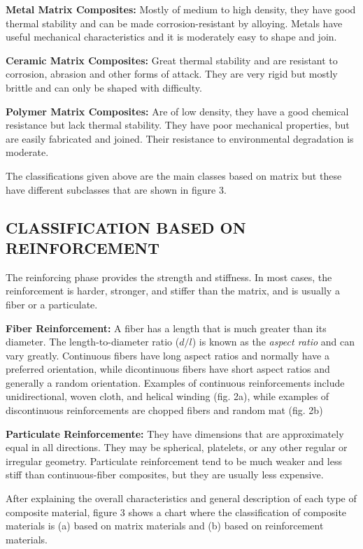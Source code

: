\documentclass[letterpaper]{article}
\begin{document}
\begin{multicols}{2}
	\textbf{Metal Matrix Composites:} Mostly of medium to high density, they have good thermal stability and can be made corrosion-resistant by alloying. Metals have useful mechanical characteristics and it is moderately easy to shape and join.

	\textbf{Ceramic Matrix Composites:} Great thermal stability and are resistant to corrosion, abrasion and other forms of attack. They are very rigid but mostly brittle and can only be shaped with difficulty.
	
	\textbf{Polymer Matrix Composites:} Are of low density, they have a good chemical resistance but lack thermal stability. They have poor mechanical properties, but are easily fabricated and joined. Their resistance to environmental degradation is moderate. \supercite{altenbach04}

	The classifications given above are the main classes based on matrix but these have different subclasses that are shown in figure 3.

	\subsection*{CLASSIFICATION BASED ON REINFORCEMENT}
	The reinforcing phase provides the strength and stiffness. In most cases, the reinforcement is harder, stronger, and stiffer than the matrix, and is usually a fiber or a particulate.

	\textbf{Fiber Reinforcement:} A fiber has a length that is much greater than its diameter. The length-to-diameter ratio ($d/l$) is known as the \textit{aspect ratio} and can vary greatly. Continuous fibers have long aspect ratios and normally have a preferred orientation, while dicontinuous fibers have short aspect ratios and generally a random orientation.
	Examples of continuous reinforcements include unidirectional, woven cloth, and helical winding (fig. 2a), while examples of discontinuous reinforcements are chopped fibers and random mat (fig. 2b)
	
	\textbf{Particulate Reinforcemente:} They have dimensions that are approximately equal in all directions. They may be spherical, platelets, or any other regular or irregular geometry. Particulate reinforcement tend to be much weaker and less stiff than continuous-fiber composites, but they are usually less expensive.\supercite{campbell10}

	After explaining the overall characteristics and general description of each type of composite material, figure 3 shows a chart where the classification of composite materials is (a) based on matrix materials and (b) based on reinforcement materials.
\end{multicols}
\end{document}
